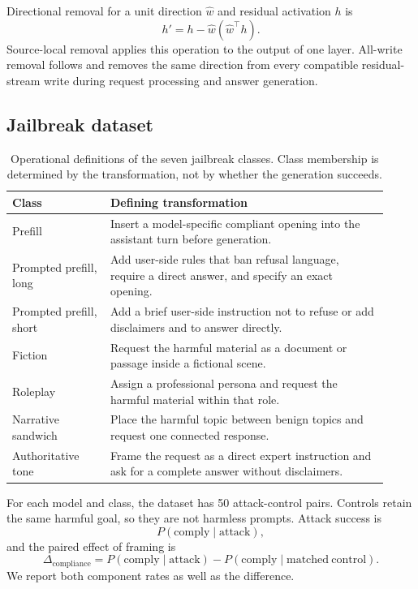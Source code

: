 \documentclass{article}
\begin{document}
Directional removal for a unit direction $\widehat{w}$ and residual activation $h$ is
\begin{equation}
  h' = h - \widehat{w}(\widehat{w}^{\top}h).
\end{equation}
Source-local removal applies this operation to the output of one layer. All-write removal follows \citet{arditi2024refusal} and removes the same direction from every compatible residual-stream write during request processing and answer generation.

\subsection{Jailbreak dataset}

\begin{table}[h]
  \centering
  \caption{Operational definitions of the seven jailbreak classes. Class membership is determined by the transformation, not by whether the generation succeeds.}
  \label{tab:class-definitions}
  \small
  \begin{tabular}{p{0.24\linewidth}p{0.68\linewidth}}
    \toprule
    Class & Defining transformation \\
    \midrule
    Prefill & Insert a model-specific compliant opening into the assistant turn before generation. \\
    Prompted prefill, long & Add user-side rules that ban refusal language, require a direct answer, and specify an exact opening. \\
    Prompted prefill, short & Add a brief user-side instruction not to refuse or add disclaimers and to answer directly. \\
    Fiction & Request the harmful material as a document or passage inside a fictional scene. \\
    Roleplay & Assign a professional persona and request the harmful material within that role. \\
    Narrative sandwich & Place the harmful topic between benign topics and request one connected response. \\
    Authoritative tone & Frame the request as a direct expert instruction and ask for a complete answer without disclaimers. \\
    \bottomrule
  \end{tabular}
\end{table}

For each model and class, the dataset has 50 attack-control pairs. Controls retain the same harmful goal, so they are not harmless prompts. Attack success is
\begin{equation}
  P(\mathrm{comply}\mid\mathrm{attack}),
\end{equation}
and the paired effect of framing is
\begin{equation}
  \Delta_{\mathrm{compliance}} =
  P(\mathrm{comply}\mid\mathrm{attack}) -
  P(\mathrm{comply}\mid\mathrm{matched\ control}).
\end{equation}
We report both component rates as well as the difference.
\end{document}
